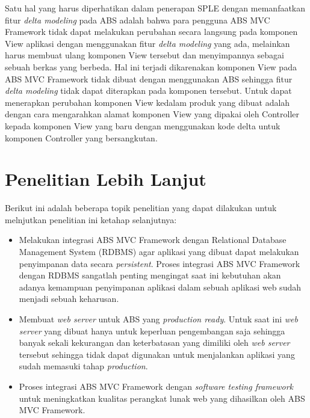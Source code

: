 Satu hal yang harus diperhatikan dalam penerapan SPLE dengan memanfaatkan fitur \textit{delta modeling} pada ABS adalah bahwa para pengguna ABS MVC Framework tidak dapat melakukan perubahan secara langsung pada komponen View aplikasi dengan menggunakan fitur \textit{delta modeling} yang ada, melainkan harus membuat ulang komponen View tersebut dan menyimpannya sebagai sebuah berkas yang berbeda. Hal ini terjadi dikarenakan komponen View pada ABS MVC Framework tidak dibuat dengan menggunakan ABS sehingga fitur \textit{delta modeling} tidak dapat diterapkan pada komponen tersebut. Untuk dapat menerapkan perubahan komponen View kedalam produk yang dibuat adalah dengan cara mengarahkan alamat komponen View yang dipakai oleh Controller kepada komponen View yang baru dengan menggunakan kode delta untuk komponen Controller yang bersangkutan.

\section{Penelitian Lebih Lanjut}
Berikut ini adalah beberapa topik penelitian yang dapat dilakukan untuk melnjutkan penelitian ini ketahap selanjutnya:

\begin{itemize}
    \item Melakukan integrasi ABS MVC Framework dengan Relational Database Management System (RDBMS) agar aplikasi yang dibuat dapat melakukan penyimpanan data secara \textit{persistent}. Proses integrasi ABS MVC Framework dengan RDBMS sangatlah penting mengingat saat ini kebutuhan akan adanya kemampuan penyimpanan aplikasi dalam sebuah aplikasi web sudah menjadi sebuah keharusan.
    \item Membuat \textit{web server} untuk ABS yang \textit{production ready}. Untuk saat ini \textit{web server} yang dibuat hanya untuk keperluan pengembangan saja sehingga banyak sekali kekurangan dan keterbatasan yang dimiliki oleh \textit{web server} tersebut sehingga tidak dapat digunakan untuk menjalankan aplikasi yang sudah memasuki tahap \textit{production}.
    \item Proses integrasi ABS MVC Framework dengan \textit{software testing framework} untuk meningkatkan kualitas perangkat lunak web yang dihasilkan oleh ABS MVC Framework.
\end{itemize}